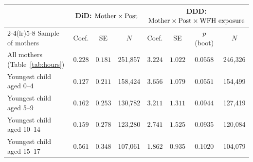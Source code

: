 \begin{tabular}{lccccccc}
\toprule
 & \multicolumn{3}{c}{DiD: $\text{Mother} \times \text{Post}$} & \multicolumn{4}{c}{DDD: $\text{Mother} \times \text{Post} \times \text{WFH exposure}$} \\
\cmidrule(lr){2-4}\cmidrule(lr){5-8}
Sample of mothers & Coef. & SE & $N$ & Coef. & SE & $p$ (boot) & $N$ \\
\midrule
All mothers (Table~\ref{tab:hours}) & $0.228$ & $0.181$ & 251{,}857 & $3.224$\sym{**} & $1.022$ & $0.0558$ & 246{,}326 \\
\midrule
Youngest child aged 0--4 & $0.127$ & $0.211$ & 158{,}424 & $3.656$\sym{**} & $1.079$ & $0.0551$ & 154{,}499 \\
Youngest child aged 5--9 & $0.162$ & $0.253$ & 130{,}782 & $3.211$\sym{*} & $1.311$ & $0.0944$ & 127{,}419 \\
Youngest child aged 10--14 & $0.159$ & $0.278$ & 123{,}280 & $2.741$\sym{\cdot} & $1.525$ & $0.0935$ & 120{,}084 \\
Youngest child aged 15--17 & $0.561$ & $0.348$ & 107{,}061 & $1.862$\sym{\cdot} & $0.935$ & $0.1020$ & 104{,}079 \\
\bottomrule
\end{tabular}
